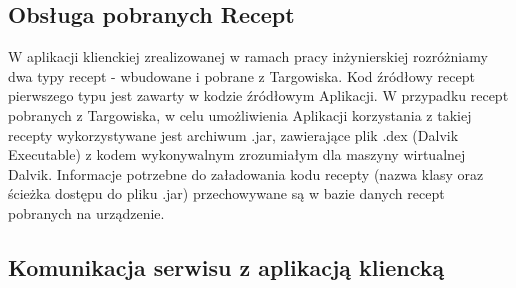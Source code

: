\documentclass[11pt,a4paper,polish,thesis]{dcsbook}
\begin{document}
\subsection {Obsługa pobranych Recept}
W aplikacji klienckiej zrealizowanej w ramach pracy inżynierskiej rozróżniamy dwa typy recept - wbudowane i pobrane z Targowiska. Kod źródłowy recept pierwszego typu jest zawarty w kodzie źródłowym Aplikacji. W przypadku recept pobranych z Targowiska, w celu umożliwienia Aplikacji korzystania z takiej recepty wykorzystywane jest archiwum .jar, zawierające plik .dex (Dalvik Executable) z kodem wykonywalnym  zrozumiałym dla maszyny wirtualnej Dalvik. Informacje potrzebne do załadowania kodu recepty (nazwa klasy oraz ścieżka dostępu do pliku .jar) przechowywane są w bazie danych recept pobranych na urządzenie. 
\subsection{Komunikacja serwisu z aplikacją kliencką}
\end{document}

